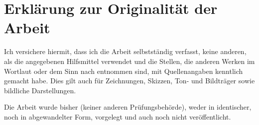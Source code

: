 \chapter*{Erklärung zur Originalität der Arbeit}
Ich versichere hiermit, dass ich die Arbeit selbstständig verfasst, keine anderen, als die angegebenen Hilfsmittel verwendet und die Stellen, die anderen Werken im Wortlaut oder dem Sinn nach entnommen sind, mit Quellenangaben kenntlich gemacht habe. Dies gilt auch für Zeichnungen, Skizzen, Ton- und Bildträger sowie bildliche Darstellungen.

Die Arbeit wurde bisher (keiner anderen Prüfungsbehörde), weder in identischer, noch in abgewandelter Form, vorgelegt und auch noch nicht veröffentlicht.
